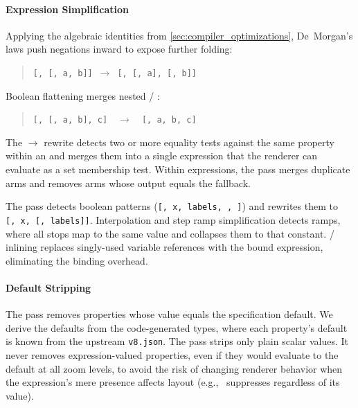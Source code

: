 \paragraph{Expression Simplification}
Applying the algebraic identities from \cref{sec:compiler_optimizations}, De~Morgan's laws push negations inward to expose further folding:
\begin{quote}
\texttt{[,~[,~a,~b]]}~$\to$~\texttt{[,~[,~a],~[,~b]]}
\end{quote}
\noindent Boolean flattening merges nested / :
\begin{quote}
\texttt{[,~[,~a,~b],~c]}~~$\to$~~\texttt{[,~a,~b,~c]}
\end{quote}
\noindent The $\to$ rewrite detects two or more equality tests against the same property within an  and merges them into a single  expression that the renderer can evaluate as a set membership test.
Within  expressions, the pass merges duplicate arms and removes arms whose output equals the fallback.

\begin{sloppypar}
The pass detects boolean  patterns (\texttt{[,\allowbreak~x,\allowbreak~labels,\allowbreak~,\allowbreak~]}) and rewrites them to \texttt{[,\allowbreak~x,\allowbreak~[,\allowbreak~labels]]}.
Interpolation and step ramp simplification detects ramps, where all stops map to the same value and collapses them to that constant.
/  inlining replaces singly-used variable references with the bound expression, eliminating the binding overhead.
\end{sloppypar}

\paragraph{Default Stripping}
The pass removes properties whose value equals the specification default.
We derive the defaults from the code-generated types, where each property's default is known from the upstream \texttt{v8.json}.
The pass strips only plain scalar values.
It never removes expression-valued properties, even if they would evaluate to the default at all zoom levels, to avoid the risk of changing renderer behavior when the expression's mere presence affects layout (e.g.,\  suppresses  regardless of its value).

